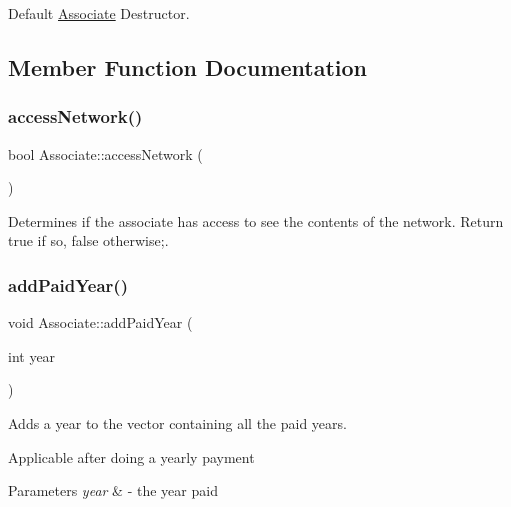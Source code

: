Default \mbox{\hyperlink{classAssociate}{Associate}} Destructor. 



\subsection{Member Function Documentation}
\mbox{\label{classAssociate_a147bd9c2b6148974d8c36f7a8f5b632a}} 
\subsubsection{\texorpdfstring{access\+Network()}{accessNetwork()}}
{\footnotesize\ttfamily bool Associate\+::access\+Network (\begin{DoxyParamCaption}{ }\end{DoxyParamCaption})}



Determines if the associate has access to see the contents of the network. Return true if so, false otherwise;. 

\mbox{\label{classAssociate_a12bec7095075fd58fafb5ebf2a24e924}} 
\subsubsection{\texorpdfstring{add\+Paid\+Year()}{addPaidYear()}}
{\footnotesize\ttfamily void Associate\+::add\+Paid\+Year (\begin{DoxyParamCaption}\item[{int}]{year }\end{DoxyParamCaption})}



Adds a year to the vector containing all the paid years. 

Applicable after doing a yearly payment


\begin{DoxyParams}{Parameters}
{\em year} & -\/ the year paid \\
\hline
\end{DoxyParams}
\mbox{\label{classAssociate_a3fcb7919843353de4d4591b2bd627189}} 
